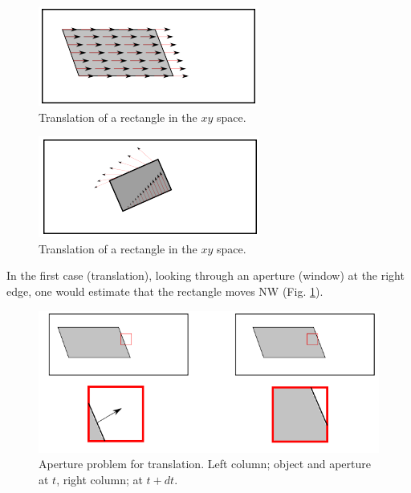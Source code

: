 \documentclass[a4paper]{article}
\begin{document}
\begin{multicols}{2}
 \begin{figure}[H]
    \centering
    \includegraphics[scale=0.8]{img/opt_flow/rect_translation.PNG}
    \caption{Translation of a rectangle in the $xy$ space.}
\end{figure}   
  
\columnbreak
\begin{figure}[H]
    \centering
    \includegraphics[scale=0.8]{img/opt_flow/rect_rotation.PNG}
    \caption{Translation of a rectangle in the $xy$ space.}
\end{figure}
\end{multicols}
In the first case (translation), looking through an aperture (window) at the right edge, one would estimate that the rectangle moves NW (Fig. \ref{fig:aperture_translation}). 
\begin{figure}[H]
    \centering
    \includegraphics[scale=0.8]{img/opt_flow/aperture_translation.png}
    \caption{Aperture problem for translation. Left column; object and aperture at $t$, right column; at $t+dt$.}
    \label{fig:aperture_translation}
\end{figure}
\end{document}
